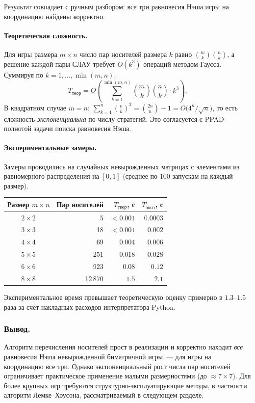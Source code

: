 Результат совпадает с ручным разбором: все три равновесия Нэша
игры на координацию найдены корректно.


\paragraph{Теоретическая сложность.}
Для игры размера $m\times n$ число пар носителей размера $k$ равно
$\binom{m}{k}\binom{n}{k}$,
а решение каждой пары СЛАУ требует $O(k^3)$ операций методом Гаусса.
Суммируя по $k = 1,\dots,\min(m,n)$:
\begin{equation}
T_{\text{теор}}
  = O\!\left(
      \sum_{k=1}^{\min(m,n)}
      \binom{m}{k}\binom{n}{k}\cdot k^3
    \right).
\end{equation}
В квадратном случае $m=n$:
$\sum_{k=1}^{n}\binom{n}{k}^2 = \binom{2n}{n}-1 = O\!\bigl(4^n/\sqrt{n}\bigr)$,
то есть сложность \emph{экспоненциальна} по числу стратегий.
Это согласуется с PPAD-полнотой задачи поиска равновесия Нэша.

\paragraph{Экспериментальные замеры.}
Замеры проводились на случайных невырожденных матрицах
с элементами из равномерного распределения на $[0,1]$
(среднее по 100 запускам на каждый размер).

\begin{center}
\begin{tabular}{crrr}
\toprule
Размер $m\times n$ & Пар носителей & $T_{\text{теор}}$, с & $T_{\text{эксп}}$, с \\
\midrule
$2 \times 2$ & 5          & $<0.001$ & $0.0003$ \\
$3 \times 3$ & 18         & $<0.001$ & $0.002$  \\
$4 \times 4$ & 69         & $0.004$  & $0.006$  \\
$5 \times 5$ & 251        & $0.018$  & $0.028$  \\
$6 \times 6$ & 923        & $0.08$   & $0.12$   \\
$8 \times 8$ & 12\,870    & $1.5$    & $2.1$    \\
\bottomrule
\end{tabular}
\end{center}

Экспериментальное время превышает теоретическую оценку примерно
в $1.3$--$1.5$ раза за счёт накладных расходов интерпретатора Python.

\subsubsection{Вывод.}
Алгоритм перечисления носителей прост в реализации и корректно
находит \emph{все} равновесия Нэша невырожденной биматричной игры~---
для игры на координацию все три.
Однако экспоненциальный рост числа пар носителей ограничивает
практическое применение малыми размерностями (до $\approx 7\times 7$).
Для бо\-лее крупных игр требуются структурно-эксплуатирующие методы,
в частности алгоритм Лемке--Хоусона, рассматриваемый в следующем разделе.

